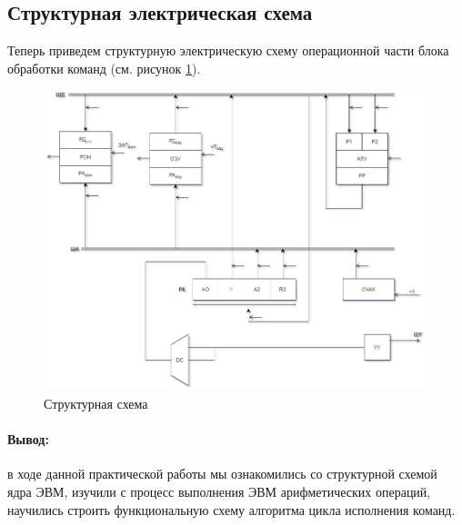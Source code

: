 \documentclass[a4paper,14pt]{extarticle}
\begin{document}
\subsection*{Структурная электрическая схема}
Теперь приведем структурную электрическую схему операционной части блока обработки команд (см. рисунок \ref{fig:unit}).
\begin{figure}[htpb]
	\centering
	\includegraphics[width=0.5\linewidth]{images/unit}
	\caption{Структурная схема}
	\label{fig:unit}
\end{figure}


\paragraph{Вывод:}
в ходе данной практической работы мы ознакомились со структурной
схемой ядра ЭВМ, изучили с процесс выполнения ЭВМ арифметических
операций, научились строить функциональную схему алгоритма цикла исполнения команд.
\end{document}
